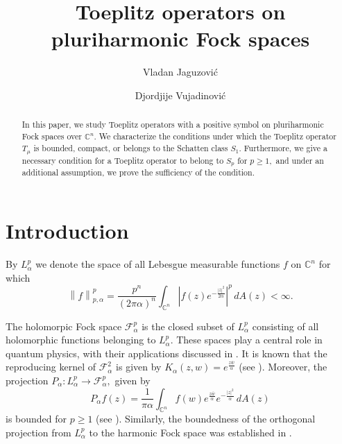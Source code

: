 \documentclass[10pt,leqno]{amsart}
\theoremstyle{remark}
\numberwithin{equation}{section}
\begin{document}
\title[Toeplitz operators on pluriharmonic Fock spaces]{Toeplitz operators on pluriharmonic Fock spaces} %
\author{Vladan Jaguzović}
\address{ Faculty of Natural Sciences and Mathematics, University of Banja Luka,
	Mladena Stojanovića 2,
	78000 Banja Luka,
	Republic of Srpska,
	Bosnia and Herzegovina
}
\author{Djordjije Vujadinovi\'c}
\address{Faculty of Natural Sciences and Mathematics, University of
	Montenegro, Cetinjski put b.b. 81000 Podgorica, Montenegro}

\begin{NoHyper} %
	\let\thefootnote\relax
\end{NoHyper}
\begin{abstract}
	In this paper, we study Toeplitz operators with a positive symbol on pluriharmonic Fock spaces over $\mathbb{C}^{n}.$ We characterize the conditions under which the Toeplitz operator $T_\mu$ is  bounded, compact, or belongs to the Schatten class $S_1$. Furthermore, we give a necessary condition for a Toeplitz operator to belong to $S_p$ for $p \geq 1,$ and under an additional assumption, we prove the sufficiency of the condition.
\end{abstract} %
\maketitle \pagestyle{myheadings}
\section{Introduction}
By $L_\alpha^p$ we denote the space of all Lebesgue measurable functions $f$ on $\mathbb{C}^{n}$ for which
\[
	\left\lVert f \right\rVert _{p,\alpha}^{p}=\frac{p^{n}}{\left( 2\pi \alpha \right) ^{n}}\int_{\mathbb{C}^{n}}^{}\left| f(z)e^{-\frac{|z|^2}{2\alpha}	} \right|^{p} \, dA(z) < \infty.
\]

The holomorpic Fock space $\mathcal{F}_\alpha^{p}$ is the closed subset of $L_\alpha^p$ consisting of all holomorphic functions belonging to $L_\alpha^p.$ These spaces play a central role in quantum physics, with their applications discussed in \cite{perelomovGeneralizedCoherentStates1977}. It is known that the reproducing kernel of $\mathcal{F}_\alpha^{2}$ is given by $K_\alpha(z,w)=e^{\frac{z \bar{w}}{\alpha}}$ (see \cite{KeheZhuAnalysisOnFockSpaces}). Moreover, the projection $P_\alpha : L_\alpha^p \to \mathcal{F}_\alpha^{p},$ given by
\[
	P_\alpha f(z)=\frac{1}{\pi \alpha}\int_{\mathbb{C}^n}^{}f(w) e^{\frac{z \bar{w}}{\alpha}}e^{-\frac{|z|^2}{\alpha}}\, dA(z)
\]
is bounded for $p \geq 1$ (see \cite{KeheZhuAnalysisOnFockSpaces}). Similarly, the boundedness of the orthogonal projection from $L_\alpha^{p}$ to the harmonic Fock space was established in \cite{vujadinovicBoundednessoftheorthogonal2022}.
\end{document}
